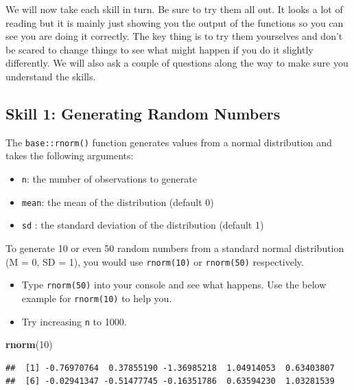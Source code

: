 \documentclass[]{book}
\newenvironment{Shaded}{\begin{snugshade}}{\end{snugshade}}
\newcommand{\DecValTok}[1]{\textcolor[rgb]{0.00,0.00,0.81}{#1}}
\newcommand{\KeywordTok}[1]{\textcolor[rgb]{0.13,0.29,0.53}{\textbf{#1}}}
\newcommand{\NormalTok}[1]{#1}
\providecommand{\tightlist}{%
  \setlength{\itemsep}{0pt}\setlength{\parskip}{0pt}}
\begin{document}
We will now take each skill in turn. Be sure to try them all out. It looks a lot of reading but it is mainly just showing you the output of the functions so you can see you are doing it correctly. The key thing is to try them yourselves and don't be scared to change things to see what might happen if you do it slightly differently. We will also ask a couple of questions along the way to make sure you understand the skills.

\hypertarget{skill-1-generating-random-numbers}{%
\subsection{Skill 1: Generating Random Numbers}\label{skill-1-generating-random-numbers}}

The \texttt{base::rnorm()} function generates values from a normal distribution and takes the following arguments:

\begin{itemize}
\tightlist
\item
  \texttt{n}: the number of observations to generate
\item
  \texttt{mean}: the mean of the distribution (default 0)
\item
  \texttt{sd} : the standard deviation of the distribution (default 1)
\end{itemize}

To generate 10 or even 50 random numbers from a standard normal distribution (M = 0, SD = 1), you would use \texttt{rnorm(10)} or \texttt{rnorm(50)} respectively.

\begin{itemize}
\tightlist
\item
  Type \texttt{rnorm(50)} into your console and see what happens. Use the below example for \texttt{rnorm(10)} to help you.\\
\item
  Try increasing \texttt{n} to 1000.
\end{itemize}

\begin{Shaded}
\begin{Highlighting}[]
\KeywordTok{rnorm}\NormalTok{(}\DecValTok{10}\NormalTok{)}
\end{Highlighting}
\end{Shaded}

\begin{verbatim}
##  [1] -0.76970764  0.37855190 -1.36985218  1.04914053  0.63403807
##  [6] -0.02941347 -0.51477745 -0.16351786  0.63594230  1.03281539
\end{verbatim}
\end{document}
